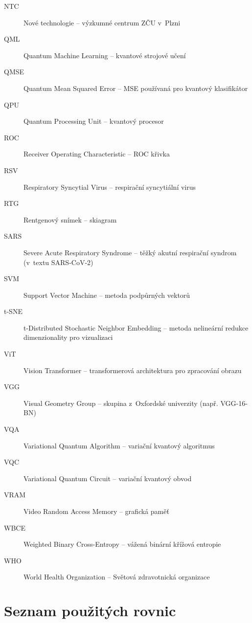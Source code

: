 \documentclass[12pt, a4paper]{report}
\begin{document}
\begin{description}
  \item[NTC] Nové technologie – výzkumné centrum ZČU v~Plzni
  \item[QML] Quantum Machine Learning – kvantové strojové učení
  \item[QMSE] Quantum Mean Squared Error – MSE používaná pro kvantový klasifikátor
  \item[QPU] Quantum Processing Unit – kvantový procesor
  \item[ROC] Receiver Operating Characteristic – ROC křivka
  \item[RSV] Respiratory Syncytial Virus – respirační syncytiální virus
  \item[RTG] Rentgenový snímek – skiagram
  \item[SARS] Severe Acute Respiratory Syndrome – těžký akutní respirační syndrom (v~textu SARS-CoV-2)
  \item[SVM] Support Vector Machine – metoda podpůrných vektorů
  \item[t-SNE] t-Distributed Stochastic Neighbor Embedding – metoda nelineární redukce dimenzionality pro vizualizaci
  \item[ViT] Vision Transformer – transformerová architektura pro zpracování obrazu
  \item[VGG] Visual Geometry Group – skupina z~Oxfordské univerzity (např. VGG-16-BN)
  \item[VQA] Variational Quantum Algorithm – variační kvantový algoritmus
  \item[VQC] Variational Quantum Circuit – variační kvantový obvod
  \item[VRAM] Video Random Access Memory – grafická paměť
  \item[WBCE] Weighted Binary Cross-Entropy – vážená binární křížová entropie
  \item[WHO] World Health Organization – Světová zdravotnická organizace
\end{description}

\chapter*{Seznam použitých rovnic}
\listofmyequations
\end{document}
